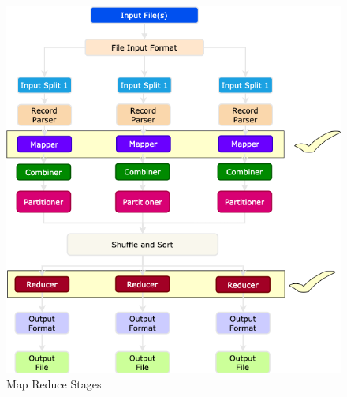 \begin{frame}
	
	\begin{figure}
		\includegraphics[height=.925\textheight]{./Figures/chapter-02/Map-Reduce_2.png}
		\caption{Map Reduce Stages } \label{fig:MRSteps2}
	\end{figure}			
\end{frame}

